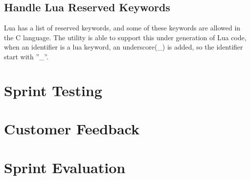 \subsection{Handle Lua Reserved Keywords}
Lua has a list of reserved keywords, and some of these keywords are allowed in 
the C language. The utility is able to support this under generation of Lua 
code, when an identifier is a lua keyword, an underscore(\_) is added, so the 
identifier start with ''\_''.

\section{Sprint Testing}


\section{Customer Feedback}


\section{Sprint Evaluation}


